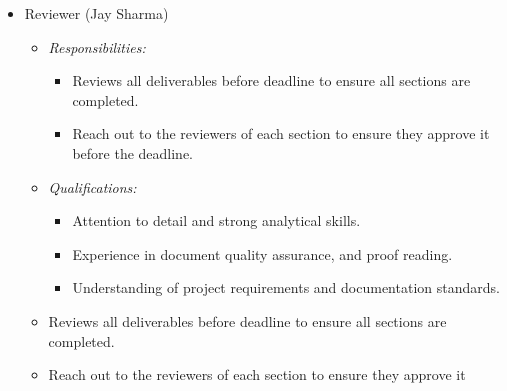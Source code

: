 \documentclass{article}
\begin{document}
\begin{itemize}
\begin{itemize}
\begin{itemize}
          \item Ensures that the team sticks to the agenda.
        \end{itemize}
      \item \textit{Qualifications:}
        \begin{itemize}
          \item Great time management and facilitation skills. 
          \item Strong interpersonal, communication and organizational skills. 
          \item Prior experience in leading meetings. 
        \end{itemize}
      \item Creates the agenda for meetings.
      \item Facilitates the meetings.
      \item Ensures that the team sticks to the agenda.
      \item Technical Role: Full Stack Developer - responsible for the 
      development of the processing algorithms.
    \end{itemize}
  \item Reviewer (Jay Sharma)
    \begin{itemize}
      \item \textit{Responsibilities:}
        \begin{itemize}
          \item Reviews all deliverables before deadline to ensure all sections
           are completed.
          \item Reach out to the reviewers of each section to ensure they
          approve it before the deadline.
        \end{itemize}
      \item \textit{Qualifications:}
        \begin{itemize}
          \item Attention to detail and strong analytical skills.
          \item Experience in document quality assurance, and proof reading. 
          \item Understanding of project requirements and documentation
          standards. 
        \end{itemize}
      \item Reviews all deliverables before deadline to ensure all sections are
      completed.
      \item Reach out to the reviewers of each section to ensure they approve it

\end{itemize}
\end{itemize}
\end{document}
